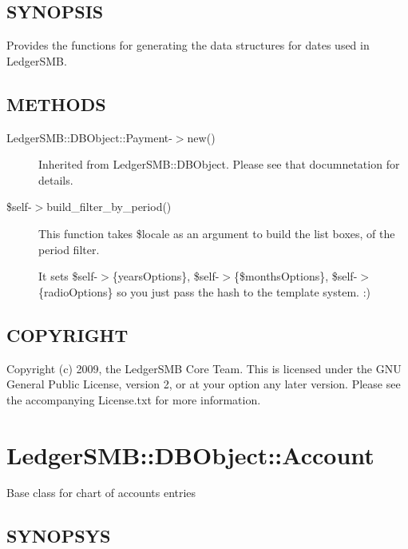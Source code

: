 \begin{description}
\begin{description}
\begin{description}
\begin{description}
\begin{description}
\begin{description}
\begin{description}
\begin{description}
\begin{description}
\subsection*{SYNOPSIS\label{LedgerSMB::DBobject::Date_SYNOPSIS}}


Provides the functions for generating the data structures for dates used in 
LedgerSMB.

\subsection*{METHODS\label{LedgerSMB::DBobject::Date_METHODS}}
\begin{description}

\item[{LedgerSMB::DBObject::Payment-$>$new()}] \mbox{}

Inherited from LedgerSMB::DBObject.  Please see that documnetation for details.


\item[{\$self-$>$build\_filter\_by\_period()}] \mbox{}

This function takes \$locale as an argument to build the list boxes, of the
period filter.



It sets \$self-$>$\{yearsOptions\}, \$self-$>$\{\$monthsOptions\}, \$self-$>$\{radioOptions\} 
so you just pass the hash to the template system. :)

\end{description}
\subsection*{COPYRIGHT\label{LedgerSMB::DBobject::Date_COPYRIGHT}}


Copyright (c) 2009, the LedgerSMB Core Team.  This is licensed under the GNU 
General Public License, version 2, or at your option any later version.  Please 
see the accompanying License.txt for more information.

\section{LedgerSMB::DBObject::Account\label{LedgerSMB::DBObject::Account}}


Base class for chart of accounts entries

\subsection*{SYNOPSYS\label{LedgerSMB::DBObject::Account_SYNOPSYS}}



\end{description}
\end{description}
\end{description}
\end{description}
\end{description}
\end{description}
\end{description}
\end{description}
\end{description}
